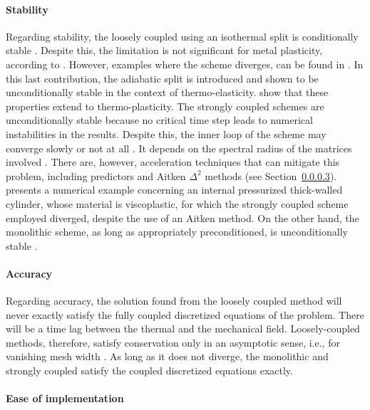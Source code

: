 \paragraph{Stability}

Regarding stability, the loosely coupled using an isothermal split is conditionally stable \citep{armero_new_1992}.
Despite this, the limitation is not significant for metal plasticity, according to \cite{simo_associative_1992}.
However, examples where the scheme diverges, can be found in \cite{armero_new_1992}.
In this last contribution, the adiabatic split is introduced and shown to be unconditionally stable in the context of thermo-elasticity.
\cite{armero_priori_1993} show that these properties extend to thermo-plasticity.
The strongly coupled schemes are unconditionally stable because no critical time step leads to numerical instabilities in the results.
Despite this, the inner loop of the scheme may converge slowly or not at all \citep{matthies_strong_2003}.
It depends on the spectral radius of the matrices involved \citep{cervera_computational_1996}.
There are, however, acceleration techniques that can mitigate this problem, including predictors and Aitken \(\Delta^2\) methods (see Section~\ref{}).
\cite{danowski_computational_2014} presents a numerical example concerning an internal pressurized thick-walled cylinder, whose material is viscoplastic, for which the strongly coupled scheme employed diverged, despite the use of an Aitken method.
On the other hand, the monolithic scheme, as long as appropriately preconditioned, is unconditionally stable \citep{danowski_computational_2014}.

\paragraph{Accuracy}

Regarding accuracy, the solution found from the loosely coupled method will never exactly satisfy the fully coupled discretized equations of the problem.
There will be a time lag between the thermal and the mechanical field.
Loosely-coupled methods, therefore, satisfy conservation only in an asymptotic sense, i.e., for vanishing mesh width \citep{michler_efficient_2005}.
As long as it does not diverge, the monolithic and strongly coupled satisfy the coupled discretized equations exactly.

\paragraph{Ease of implementation}

